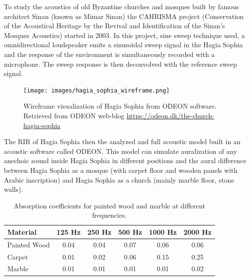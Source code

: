             To study the acoustics of old Byzantine churches and mosques built by famous architect Sinan (known as Mimar Sinan) the CAHRISMA project (Conservation of the Acoustical Heritage by the Revival and Identification of the Sinan’s Mosques Acoustics) started in 2003\cite{Hagia_Sophia_Multisensory_Aestethics}. In this project, sine sweep technique used, a omnidirectional loudspeaker emits a sinusoidal sweep signal in the Hagia Sophia and the response of the environment is simultaneously recorded with a microphone. The sweep response is then deconvolved with the reference sweep signal\cite{Odeon_Hagia_Sophia}.\par

            \begin{figure}[H]
                \centering
                \texttt{[image: images/hagia\_sophia\_wireframe.png]}
                \caption{Wireframe visualization of Hagia Sophia from ODEON software. Retrieved from ODEON web-blog \url{https://odeon.dk/the-church-hagia-sophia}}
                \label{fig:HS_WIREFRAME}
            \end{figure} 

            The RIR of Hagia Sophia then the analyzed and full acoustic model built in an acoustic software called ODEON\cite{Odeon_Hagia_Sophia}. This model can simulate auralization of any anechoic sound inside Hagia Sophia in different positions and the aural difference between Hagia Sophia as a mosque (with carpet floor and wooden panels with Arabic inscription) and Hagia Sophia as a church (mainly marble floor, stone walls)\cite{Revived_Acoustical_History_of_Hagia_Sophia}.\par

            \begin{table}[h!]
                \centering
                \begin{tabular}{|l|c|c|c|c|c|}
                \hline
                Material & 125 Hz & 250 Hz & 500 Hz & 1000 Hz & 2000 Hz \\
                \hline
                Painted Wood & 0.04 & 0.04 & 0.07 & 0.06 & 0.06 \\
                Carpet       & 0.01 & 0.02 & 0.06 & 0.15 & 0.25 \\
                Marble       & 0.01 & 0.01 & 0.01 & 0.01 & 0.02 \\
                \hline
                \end{tabular}
                \caption{Absorption coefficients for painted wood and marble at different frequencies\cite{Absoption_Coefficient_Table}.}
                \label{tab:COEFF}
            \end{table}

